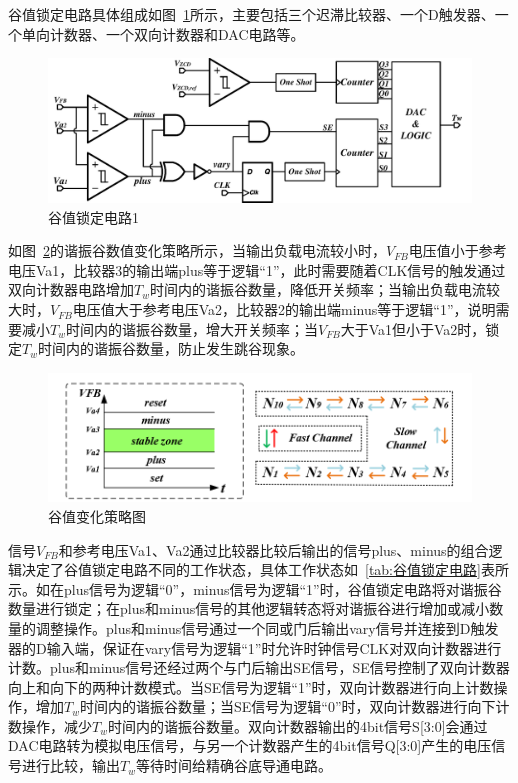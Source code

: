 谷值锁定电路具体组成如图~\ref{fig:谷值锁定电路1}所示，主要包括三个迟滞比较器、一个D触发器、一个单向计数器、一个双向计数器和DAC电路等。

\begin{figure}[htbp] 
    \centering
    \includegraphics[width=0.8\linewidth]{figures/谷值锁定电路1.pdf}
    \caption{谷值锁定电路1}
    \label{fig:谷值锁定电路1}
\end{figure} 

如图~\ref{fig:谷值变化策略}的谐振谷数值变化策略所示，当输出负载电流较小时，$V_{FB}$电压值小于参考电压Va1，比较器3的输出端plus等于逻辑“1”，此时需要随着CLK信号的触发通过双向计数器电路增加$T_w$时间内的谐振谷数量，降低开关频率；当输出负载电流较大时，$V_{FB}$电压值大于参考电压Va2，比较器2的输出端minus等于逻辑“1”，说明需要减小$T_w$时间内的谐振谷数量，增大开关频率；当$V_{FB}$大于Va1但小于Va2时，锁定$T_w$时间内的谐振谷数量，防止发生跳谷现象。

\begin{figure}[htbp] 
    \centering
    \includegraphics[width=0.8\linewidth]{figures/谷值变化策略.png}
    \caption{谷值变化策略图}
    \label{fig:谷值变化策略}
\end{figure} 

信号$V_{FB}$和参考电压Va1、Va2通过比较器比较后输出的信号plus、minus的组合逻辑决定了谷值锁定电路不同的工作状态，具体工作状态如~\ref{tab:谷值锁定电路}表所示。如在plus信号为逻辑“0”，minus信号为逻辑“1”时，谷值锁定电路将对谐振谷数量进行锁定；在plus和minus信号的其他逻辑转态将对谐振谷进行增加或减小数量的调整操作。plus和minus信号通过一个同或门后输出vary信号并连接到D触发器的D输入端，保证在vary信号为逻辑“1”时允许时钟信号CLK对双向计数器进行计数。plus和minus信号还经过两个与门后输出SE信号，SE信号控制了双向计数器向上和向下的两种计数模式。当SE信号为逻辑“1”时，双向计数器进行向上计数操作，增加$T_w$时间内的谐振谷数量；当SE信号为逻辑“0”时，双向计数器进行向下计数操作，减少$T_w$时间内的谐振谷数量。双向计数器输出的4bit信号S[3:0]会通过DAC电路转为模拟电压信号，与另一个计数器产生的4bit信号Q[3:0]产生的电压信号进行比较，输出$T_w$等待时间给精确谷底导通电路。

